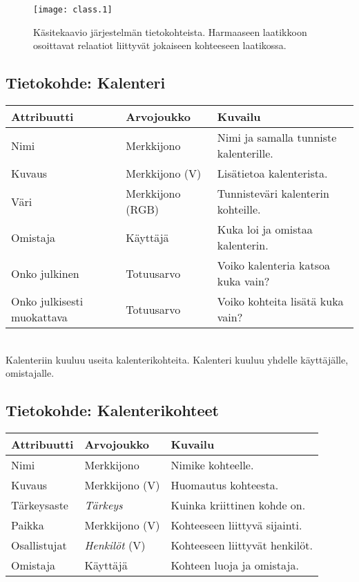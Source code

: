 \documentclass[a4paper,12pt]{report}
\begin{document}
\begin{figure}[ht]
   \centering \texttt{[image: class.1]}
   \caption{Käsitekaavio järjestelmän tietokohteista. Harmaaseen laatikkoon
   osoittavat relaatiot liittyvät jokaiseen kohteeseen laatikossa.}
   \label{graph_class}
\end{figure}

\subsection{Tietokohde: Kalenteri}
\begin{tabu}{l|l|l}
   \rowfont{\bfseries} Attribuutti & Arvojoukko & Kuvailu \\\hline
   Nimi                       & Merkkijono & Nimi ja samalla tunniste kalenterille. \\\hline
   Kuvaus                     & Merkkijono (V) & Lisätietoa kalenterista. \\\hline
   Väri                       & Merkkijono (RGB) & Tunnisteväri kalenterin kohteille. \\\hline
   Omistaja                   & Käyttäjä   & Kuka loi ja omistaa kalenterin. \\\hline
   Onko julkinen              & Totuusarvo & Voiko kalenteria katsoa kuka vain? \\\hline
   Onko julkisesti muokattava & Totuusarvo & Voiko kohteita lisätä kuka vain? \\\hline
\end{tabu}
\\[0.4cm]

Kalenteriin kuuluu useita kalenterikohteita. Kalenteri kuuluu yhdelle
käyttäjälle, omistajalle.

\subsection{Tietokohde: Kalenterikohteet}\label{kohteet_kohde}

\begin{tabu}{l|l|l}
   \rowfont{\bfseries} Attribuutti & Arvojoukko & Kuvailu \\\hline
   Nimi        & Merkkijono       & Nimike kohteelle. \\\hline
   Kuvaus      & Merkkijono (V)   & Huomautus kohteesta. \\\hline
   Tärkeysaste & \textit{Tärkeys} & Kuinka kriittinen kohde on. \\\hline
   Paikka      & Merkkijono (V)   & Kohteeseen liittyvä sijainti. \\\hline
   Osallistujat& \textit{Henkilöt} (V)& Kohteeseen liittyvät henkilöt. \\\hline
   Omistaja    & Käyttäjä         & Kohteen luoja ja omistaja. \\\hline
\end{tabu}
\\[0.4cm]
\end{document}
